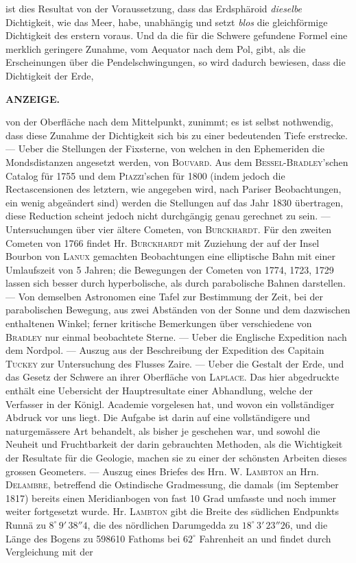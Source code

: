 ist dies Resultat von der Voraussetzung, dass das Erdsphäroid \emph{dieselbe} Dichtigkeit, wie das Meer, habe, unabhängig und setzt \emph{blos} die gleichförmige Dichtigkeit des erstern voraus. Und da die für die Schwere gefundene Formel eine merklich geringere Zunahme, vom Aequator nach dem Pol, gibt, als die Erscheinungen über die Pendelschwingungen, so wird dadurch bewiesen, dass die Dichtigkeit der Erde,\par
\clearpage
{}
\noindent{}%
\parbox[b]{\dimexpr\textwidth-20mm\relax}{\centering\small\textbf{ANZEIGE.}}%
\makebox[10mm][r]{}\par\nobreak\medskip
\noindent von der Oberfläche nach dem Mittelpunkt, zunimmt; es ist selbst nothwendig, dass diese Zunahme der Dichtigkeit sich bis zu einer bedeutenden Tiefe erstrecke. --- Ueber die Stellungen der Fixsterne, von welchen in den Ephemeriden die Mondsdistanzen angesetzt werden, von \textsc{Bouvard}. Aus dem \textsc{Bessel}-\textsc{Bradley}'schen Catalog für 1755 und dem \textsc{Piazzi}'schen für 1800 (indem jedoch die Rectascensionen des letztern, wie angegeben wird, nach Pariser Beobachtungen, ein wenig abgeändert sind) werden die Stellungen auf das Jahr 1830 übertragen, diese Reduction scheint jedoch nicht durchgängig genau gerechnet zu sein. --- Untersuchungen über vier ältere Cometen, von \textsc{Burckhardt}. Für den zweiten Cometen von 1766 findet Hr. \textsc{Burckhardt} mit Zuziehung der auf der Insel Bourbon von \textsc{Lanux} gemachten Beobachtungen eine elliptische Bahn mit einer Umlaufszeit von 5 Jahren; die Bewegungen der Cometen von 1774, 1723, 1729 lassen sich besser durch hyperbolische, als durch parabolische Bahnen darstellen. --- Von demselben Astronomen eine Tafel zur Bestimmung der Zeit, bei der parabolischen Bewegung, aus zwei Abständen von der Sonne und dem dazwischen enthaltenen Winkel; ferner kritische Bemerkungen über verschiedene von \textsc{Bradley} nur einmal beobachtete Sterne. --- Ueber die Englische Expedition nach dem Nordpol. --- Auszug aus der Beschreibung der Expedition des Capitain \textsc{Tuckey} zur Untersuchung des Flusses Zaire. --- Ueber die Gestalt der Erde, und das Gesetz der Schwere an ihrer Oberfläche von \textsc{Laplace}. Das hier abgedruckte enthält eine Uebersicht der Hauptresultate einer Abhandlung, welche der Verfasser in der Königl. Academie vorgelesen hat, und wovon ein vollständiger Abdruck vor uns liegt. Die Aufgabe ist darin auf eine vollständigere und naturgemässere Art behandelt, als bisher je geschehen war, und sowohl die Neuheit und Fruchtbarkeit der darin gebrauchten Methoden, als die Wichtigkeit der Resultate für die Geologie, machen sie zu einer der schönsten Arbeiten dieses grossen Geometers. --- Auszug eines Briefes des Hrn. W. \textsc{Lambton} an Hrn. \textsc{Delambre}, betreffend die Ostindische Gradmessung, die damals (im September 1817) bereits einen Meridianbogen von fast 10 Grad umfasste und noch immer weiter fortgesetzt wurde. Hr. \textsc{Lambton} gibt die Breite des südlichen Endpunkts Runnä zu $8^\circ\,9'\,38''4$, die des nördlichen Darumgedda zu $18^\circ\,3'\,23''26$, und die Länge des Bogens zu 598610 Fathoms bei $62^\circ$ Fahrenheit an und findet durch Vergleichung mit der 